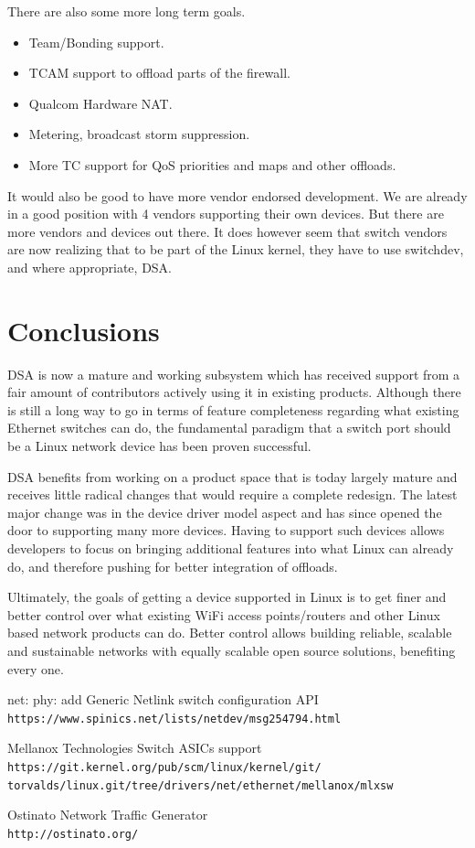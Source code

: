 \documentclass[letterpaper]{article}
\begin{document}
There are also some more long term goals.

\begin{itemize}
\item Team/Bonding support.
\item TCAM support to offload parts of the firewall.
\item Qualcom Hardware NAT.
\item Metering, broadcast storm suppression.
\item More TC support for QoS priorities and maps and other offloads.
\end{itemize}

It would also be good to have more vendor endorsed development. We are
already in a good position with 4 vendors supporting their own
devices. But there are more vendors and devices out there. It does
however seem that switch vendors are now realizing that to be part of
the Linux kernel, they have to use switchdev, and where appropriate,
DSA.

\section{Conclusions}

DSA is now a mature and working subsystem which has received support
from a fair amount of contributors actively using it in existing
products. Although there is still a long way to go in terms of feature
completeness regarding what existing Ethernet switches can do, the
fundamental paradigm that a switch port should be a Linux network
device has been proven successful.

DSA benefits from working on a product space that is today largely
mature and receives little radical changes that would require a
complete redesign.  The latest major change was in the device driver
model aspect and has since opened the door to supporting many more
devices. Having to support such devices allows developers to focus on
bringing additional features into what Linux can already do, and
therefore pushing for better integration of offloads.

Ultimately, the goals of getting a device supported in Linux is to get
finer and better control over what existing WiFi access points/routers
and other Linux based network products can do. Better control allows
building reliable, scalable and sustainable networks with equally
scalable open source solutions, benefiting every one.

\begin{thebibliography}{2}
net: phy: add Generic Netlink switch configuration API\\
\texttt{https://www.spinics.net/lists/netdev/msg254794.html}

Mellanox Technologies Switch ASICs support\\
\texttt{https://git.kernel.org/pub/scm/linux/kernel/git/\\
  torvalds/linux.git/tree/drivers/net/ethernet/mellanox/mlxsw}

  Ostinato Network Traffic Generator\\
  \texttt{http://ostinato.org/}

\end{thebibliography}
\end{document}
